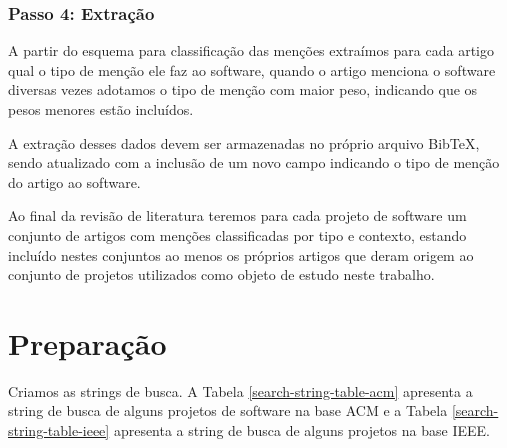 

\subsubsection{Passo 4: Extração}

A partir do esquema para classificação das menções extraímos para cada artigo
qual o tipo de menção ele faz ao software, quando o artigo menciona o software
diversas vezes adotamos o tipo de menção com maior peso, indicando que os pesos
menores estão incluídos.


A extração desses dados devem ser armazenadas no próprio arquivo BibTeX, sendo
atualizado com a inclusão de um novo campo indicando o tipo de menção do artigo
ao software.

Ao final da revisão de literatura teremos para cada projeto de software um
conjunto de artigos com menções classificadas por tipo e contexto, estando
incluído nestes conjuntos ao menos os próprios artigos que deram origem ao
conjunto de projetos utilizados como objeto de estudo neste trabalho.



\section{Preparação} \label{estudo2:preparacao} %

Criamos as strings de busca. A Tabela \ref{search-string-table-acm} apresenta a
string de busca de alguns projetos de software na base ACM e a Tabela
\ref{search-string-table-ieee} apresenta a string de busca de alguns projetos
na base IEEE.

